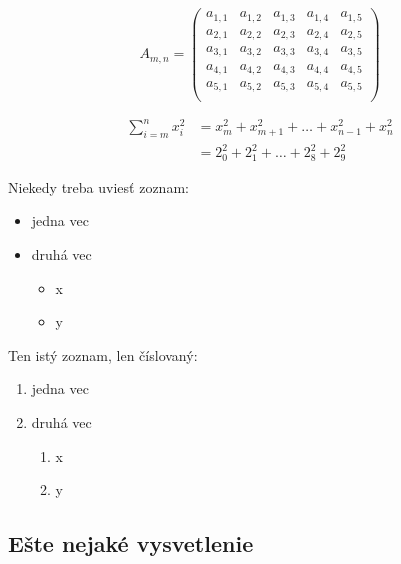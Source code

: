 \documentclass[10pt,twocolumn,twoside,slovak,english,a4paper]{article}
\begin{document}
\begin{displaymath}
A_{m,n} =
\begin{pmatrix}
a_{1, 1} & a_{1, 2} & a_{1, 3} & a_{1, 4} & a_{1, 5} \\
a_{2, 1} & a_{2, 2} & a_{2, 3} & a_{2, 4} & a_{2, 5} \\
a_{3, 1} & a_{3, 2} & a_{3, 3} & a_{3, 4} & a_{3, 5}\\
a_{4, 1} & a_{4, 2} & a_{4, 3} & a_{4, 4} & a_{4, 5}\\
a_{5, 1} & a_{5, 2} & a_{5, 3} & a_{5, 4} & a_{5, 5}\\
\end{pmatrix}
\end{displaymath}

\begin{equation}
\begin{split}
\sum_{i=m}^n x_i^2 & = x_m^2 + x_{m+1}^2 +
\dots + x_{n-1}^2 + x_{n}^2 \\
& = 2_0^2 + 2_1^2 + \dots + 2_8^2 + 2_9^2
\end{split}
\end{equation}


Niekedy treba uviesť zoznam:

\begin{itemize}
\item jedna vec

\item druhá vec
	\begin{itemize}
	\item x
	\item y

	\end{itemize}
\end{itemize}

Ten istý zoznam, len číslovaný:

\begin{enumerate}
\item jedna vec
\item druhá vec
	\begin{enumerate}
	\item x
	\item y
	\end{enumerate}
\end{enumerate}


\subsection{Ešte nejaké vysvetlenie} \label{ina:este}
\end{document}
